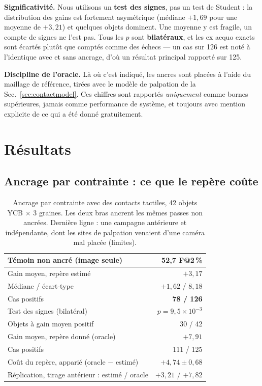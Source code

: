 \documentclass[conference]{IEEEtran}
\makeatletter
\newcommand{\gd}[1]{\textbf{#1}}
\newcommand{\Fs}{F@2\,\%}
\makeatother
\begin{document}
\textbf{Significativité.} Nous utilisons un \textbf{test des signes}, pas un test de
Student : la distribution des gains est fortement asymétrique (médiane $+1{,}69$ pour
une moyenne de $+3{,}21$) et quelques objets dominent. Une moyenne y est fragile, un
compte de signes ne l'est pas. Tous les $p$ sont \textbf{bilatéraux}, et les ex aequo
exacts sont écartés plutôt que comptés comme des échecs --- un cas sur 126 est noté à
l'identique avec et sans ancrage, d'où un résultat principal rapporté sur 125.

\textbf{Discipline de l'oracle.} Là où c'est indiqué, les ancres sont placées à l'aide
du maillage de référence, tirées avec le modèle de palpation de la Sec.~\ref{sec:contactmodel}. Ces chiffres sont rapportés \emph{uniquement} comme bornes
supérieures, jamais comme performance de système, et toujours avec mention explicite
de ce qui a été donné gratuitement.

\section{Résultats}

\subsection{Ancrage par contrainte : ce que le repère coûte}
\label{sec:res-constraint}

\begin{table}[t]
\centering
\caption{Ancrage par contrainte avec des contacts tactiles, 42 objets YCB $\times$ 3
graines. Les deux bras ancrent les mêmes passes non ancrées. Dernière ligne : une
campagne antérieure et indépendante, dont les sites de palpation venaient d'une caméra
mal placée (limites).}
\label{tab:main}
\begin{tabular}{lr}
\toprule
Témoin non ancré (image seule) & 52,7 \Fs \\
\midrule
Gain moyen, repère estimé & \gd{$+3{,}17$} \\
Médiane / écart-type & $+1{,}62$ / $8{,}18$ \\
Cas positifs & \gd{78 / 126} \\
Test des signes (bilatéral) & \gd{$p = 9{,}5\times10^{-3}$} \\
Objets à gain moyen positif & 30 / 42 \\
\midrule
Gain moyen, repère donné (oracle) & $+7{,}91$ \\
Cas positifs & 111 / 125 \\
Coût du repère, apparié (oracle $-$ estimé) & $+4{,}74 \pm 0{,}68$ \\
\midrule
Réplication, tirage antérieur : estimé / oracle & $+3{,}21$ / $+7{,}82$ \\
\bottomrule
\end{tabular}
\end{table}
\end{document}
